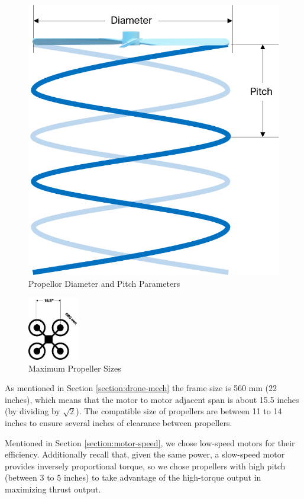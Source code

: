 \begin{figure}[h]
	\centering
	\includegraphics[scale=0.5]{img/proppitch}
	\caption{Propellor Diameter and Pitch Parameters}
	\label{fig:propeller}
\end{figure}

\begin{figure}[h]
	\centering
	\includegraphics[width=0.2\textwidth]{img/framepropsize}
	\caption{Maximum Propeller Sizes}
	\label{fig:framepropsize}
\end{figure}

As mentioned in Section \ref{section:drone-mech} the frame size is 560 mm (22 inches), which means that the motor to motor adjacent span is about 15.5 inches (by dividing by $\sqrt{2}$). The  compatible size of propellers are between 11 to 14 inches to ensure several inches of clearance between propellers.

Mentioned in Section \ref{section:motor-speed}, we chose low-speed motors for their efficiency. Additionally recall that, given the same power, a slow-speed motor provides inversely proportional torque, so we chose propellers with high pitch (between 3 to 5 inches) to take advantage of the high-torque output in maximizing thrust output.

